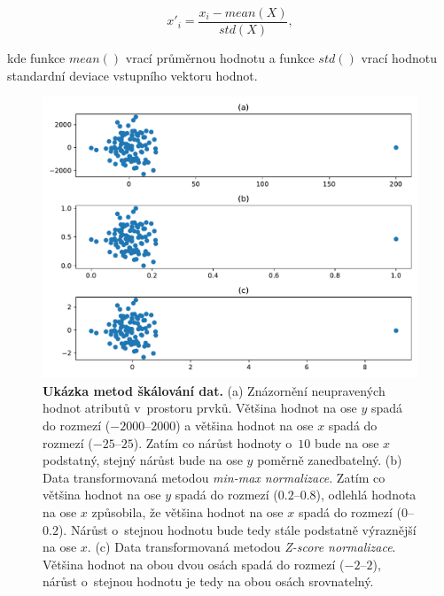 \begin{equation}
	x'_i = \frac{x_i - mean(X)}{std(X)},
\end{equation}

\medskip

\noindent kde funkce $mean()$ vrací průměrnou hodnotu a funkce $std()$ vrací hodnotu standardní deviace vstupního vektoru hodnot.\cite{data_mining}\cite{data_preprocessing}

\begin{figure}[h]
    \includegraphics[width=\textwidth]{obrazky/skalovani.pdf}
    \caption{\textbf{Ukázka metod škálování dat.} (a) Znázornění neupravených hodnot atributů v~prostoru prvků. Většina hodnot na ose $y$ spadá do rozmezí ($-2000$--$2000$) a většina hodnot na ose $x$ spadá do rozmezí ($-25$--$25$). Zatím co nárůst hodnoty o~$10$ bude na ose $x$ podstatný, stejný nárůst bude na ose $y$ poměrně zanedbatelný. (b) Data transformovaná metodou \textit{min-max normalizace}. Zatím co většina hodnot na ose $y$ spadá do rozmezí ($0.2$--$0.8$), odlehlá hodnota na ose $x$ způsobila, že většina hodnot na ose $x$ spadá do rozmezí ($0$--$0.2$). Nárůst o~stejnou hodnotu bude tedy stále podstatně výraznější na ose $x$. (c) Data transformovaná metodou \textit{Z-score normalizace}. Většina hodnot na obou dvou osách spadá do rozmezí ($-2$--$2$), nárůst o~stejnou hodnotu je tedy na obou osách srovnatelný.}
    \label{obr_sklaovani_dat}
\end{figure}

